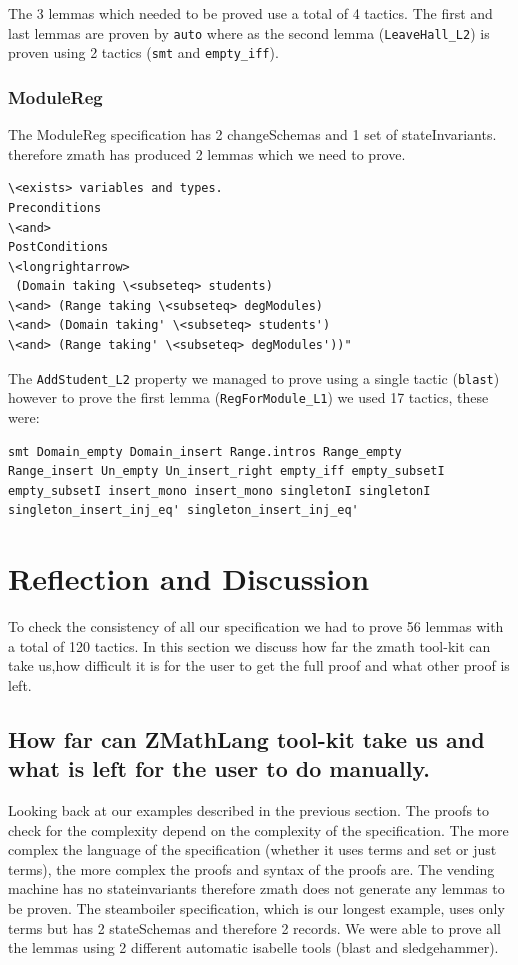 The 3 lemmas which needed to be proved use a total of 4 tactics. The first and
last lemmas are proven by \verb|auto| where as the second lemma
(\verb|LeaveHall_L2|) is proven using 2 tactics (\verb|smt| and
\verb|empty_iff|).

\subsubsection{ModuleReg}

The ModuleReg specification has 2 changeSchemas and 1 set of stateInvariants.
therefore \gls{zmath} has produced 2 lemmas which we need to prove.

\begin{verbatim}
\<exists> variables and types.
Preconditions
\<and>
PostConditions
\<longrightarrow>
 (Domain taking \<subseteq> students)
\<and> (Range taking \<subseteq> degModules)
\<and> (Domain taking' \<subseteq> students')
\<and> (Range taking' \<subseteq> degModules'))"
\end{verbatim}

The \verb|AddStudent_L2| property we managed to prove using a single tactic
(\verb|blast|) however to prove the first lemma (\verb|RegForModule_L1|) we used
17 tactics, these were:

\begin{verbatim}
smt Domain_empty Domain_insert Range.intros Range_empty 
Range_insert Un_empty Un_insert_right empty_iff empty_subsetI 
empty_subsetI insert_mono insert_mono singletonI singletonI 
singleton_insert_inj_eq' singleton_insert_inj_eq'
\end{verbatim}

\section{Reflection and Discussion}

To check the consistency of all our specification we had to prove 56 lemmas with
a total of 120 tactics. In this section we discuss how far the \gls{zmath}
tool-kit can take us,how difficult it is for the user to get the full proof and
what other proof is left.

\subsection{How far can ZMathLang tool-kit take us and what is left for the user to do manually.}

Looking back at our examples described in the previous section. The proofs to
check for the complexity depend on the complexity of the specification. The more
complex the language of the specification (whether it uses terms and set or just
terms), the more complex the proofs and syntax of the proofs are. The vending
machine has no stateinvariants therefore \gls{zmath} does not generate any
lemmas to be proven. The steamboiler specification, which is our longest
example, uses only terms but has 2 stateSchemas and therefore 2 records. We were
able to prove all the lemmas using 2 different automatic isabelle tools (blast
and sledgehammer).

